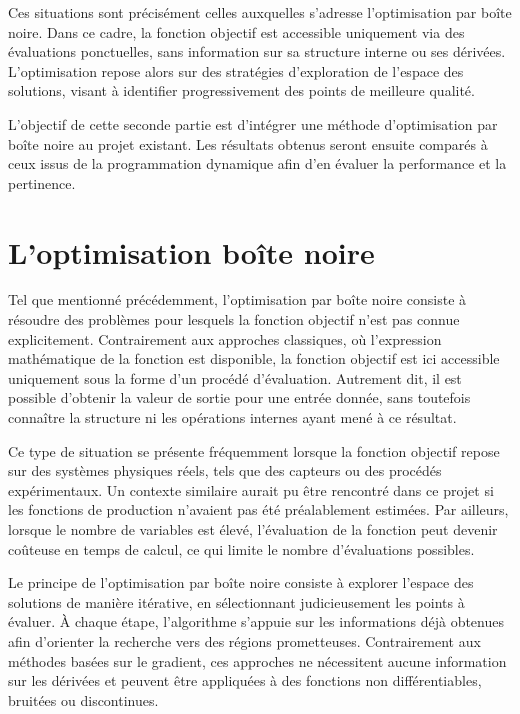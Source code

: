 \documentclass[12pt, letterpaper]{report}
\begin{document}
Ces situations sont précisément celles auxquelles s'adresse l'optimisation par boîte noire. Dans ce cadre, la fonction objectif est accessible uniquement via des évaluations ponctuelles, sans information sur sa structure interne ou ses dérivées. L'optimisation repose alors sur des stratégies d'exploration de l'espace des solutions, visant à identifier progressivement des points de meilleure qualité.

L'objectif de cette seconde partie est d'intégrer une méthode d'optimisation par boîte noire au projet existant. Les résultats obtenus seront ensuite comparés à ceux issus de la programmation dynamique afin d'en évaluer la performance et la pertinence.

\chapter{L'optimisation boîte noire}
Tel que mentionné précédemment, l'optimisation par boîte noire consiste à résoudre des problèmes pour lesquels la fonction objectif n'est pas connue explicitement. Contrairement aux approches classiques, où l'expression mathématique de la fonction est disponible, la fonction objectif est ici accessible uniquement sous la forme d'un procédé d'évaluation. Autrement dit, il est possible d'obtenir la valeur de sortie pour une entrée donnée, sans toutefois connaître la structure ni les opérations internes ayant mené à ce résultat.

Ce type de situation se présente fréquemment lorsque la fonction objectif repose sur des systèmes physiques réels, tels que des capteurs ou des procédés expérimentaux. Un contexte similaire aurait pu être rencontré dans ce projet si les fonctions de production n'avaient pas été préalablement estimées. Par ailleurs, lorsque le nombre de variables est élevé, l'évaluation de la fonction peut devenir coûteuse en temps de calcul, ce qui limite le nombre d'évaluations possibles.

Le principe de l'optimisation par boîte noire consiste à explorer l'espace des solutions de manière itérative, en sélectionnant judicieusement les points à évaluer. À chaque étape, l'algorithme s'appuie sur les informations déjà obtenues afin d'orienter la recherche vers des régions prometteuses. Contrairement aux méthodes basées sur le gradient, ces approches ne nécessitent aucune information sur les dérivées et peuvent être appliquées à des fonctions non différentiables, bruitées ou discontinues.
\end{document}
